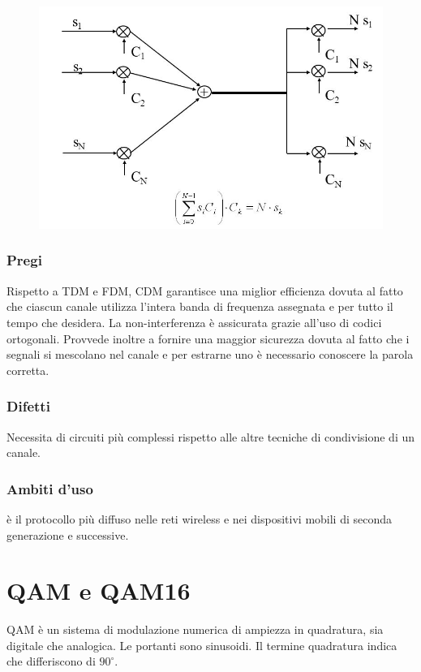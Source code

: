 \begin{figure}[H]
\centering
\includegraphics[scale=0.5]{res/img/11_CDM.png}
\end{figure}
\subsubsection{Pregi}
Rispetto a TDM e FDM, CDM garantisce una miglior efficienza dovuta al fatto che ciascun canale utilizza l'intera banda di frequenza assegnata e per tutto il tempo che desidera.
La non-interferenza è assicurata grazie all'uso di codici ortogonali.
Provvede inoltre a fornire una maggior sicurezza dovuta al fatto che i segnali si mescolano nel canale e per estrarne uno è necessario conoscere la parola corretta.
\subsubsection{Difetti}
Necessita di circuiti più complessi rispetto alle altre tecniche di condivisione di un canale.
\subsubsection{Ambiti d'uso}
è il protocollo più diffuso nelle reti wireless e nei dispositivi mobili di seconda generazione e successive.
\section{QAM e QAM16}

QAM è un sistema di modulazione numerica di ampiezza in quadratura, sia digitale che analogica. 
Le portanti sono sinusoidi. Il termine quadratura indica che differiscono di $90^{\circ}$.


